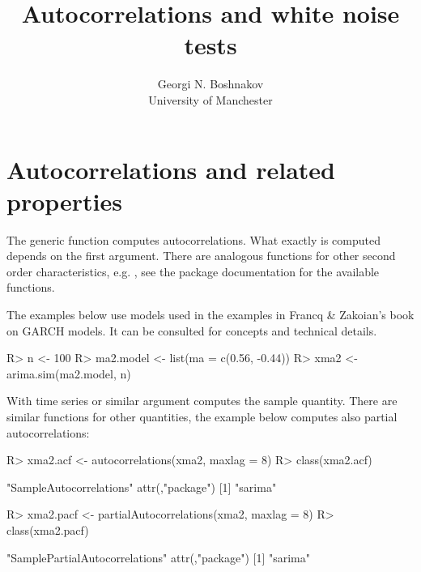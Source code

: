 \documentclass[article,nojss]{jss}
\author{Georgi N. Boshnakov \\ University of Manchester }
\title{Autocorrelations and white noise tests}
\begin{document}






\section{Autocorrelations and related properties}
\label{sec:autoc-relat-prop}

The generic function  computes autocorrelations. What exactly is
computed depends on the first argument. There are analogous functions for other second order
characteristics, e.g. , see the package documentation for the
available functions.

The examples below use models used in the examples in Francq \& Zakoian's book on GARCH
models. It can be consulted for concepts and technical details.  

\begin{Schunk}
\begin{Sinput}
R> n <- 100
R> ma2.model <- list(ma = c(0.56, -0.44))
R> xma2 <- arima.sim(ma2.model, n)
\end{Sinput}
\end{Schunk}

With time series or similar argument  computes the sample
quantity. There are similar functions for other quantities, the example below computes also
partial autocorrelations:
\begin{Schunk}
\begin{Sinput}
R> xma2.acf <- autocorrelations(xma2, maxlag = 8)
R> class(xma2.acf)
\end{Sinput}
\begin{Soutput}
[1] "SampleAutocorrelations"
attr(,"package")
[1] "sarima"
\end{Soutput}
\begin{Sinput}
R> xma2.pacf <- partialAutocorrelations(xma2, maxlag = 8)
R> class(xma2.pacf)
\end{Sinput}
\begin{Soutput}
[1] "SamplePartialAutocorrelations"
attr(,"package")
[1] "sarima"
\end{Soutput}
\end{Schunk}
\end{document}
